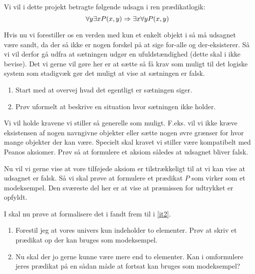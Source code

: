 \ifx\preampleIncluded\undefined
\def\startProjektTwo{}

\usepackage{enumitem}

\solutiontrue
\fi

Vi vil i dette projekt betragte følgende udsagn i ren prædikatlogik:
\[
	\forall y \exists x P(x,y) \Rightarrow \exists x \forall y P(x,y)
\]

Hvis nu vi forestiller os en verden med kun et enkelt objekt i så må udsagnet være sandt, da
der så ikke er nogen forskel på at sige for-alle og der-eksisterer. Så vi vil derfor gå udfra
at sætningen udgør en ufuldstændighed (dette skal i ikke bevise).
Det vi gerne vil gøre her er at sætte så få krav som muligt til det logiske system som stadigvæk
gør det muligt at vise at sætningen er falsk.

\begin{enumerate}
	\item Start med at overvej hvad det egentligt er sætningen siger.
	\item \label{it2} Prøv uformelt at beskrive en situation hvor sætningen ikke holder.
\end{enumerate}
	Vi vil holde kravene vi stiller så generelle som muligt. F.eks. vil vi ikke kræve eksistensen af nogen navngivne objekter eller sætte nogen øvre grænser
	for hvor mange objekter der kan være. Specielt skal kravet vi stiller være kompatibelt med Peanos aksiomer. Prøv så at formulere et aksiom således at udsagnet bliver falsk.

	Nu vil vi gerne vise at vore tilføjede aksiom er tilstrækkeligt til at vi kan vise at udsagnet er falsk. Så vi skal prøve at formulere et prædikat $P$
	som virker som et modeksempel. Den sværeste del her er at vise at præmissen for udtrykket er opfyldt.

	I skal nu prøve at formalisere det i fandt frem til i \ref{it2}. 
\begin{enumerate}[resume]
	\item Forestil jeg at vores univers kun indeholder to elementer. Prøv at skriv et prædikat op der kan bruges som modeksempel.

	\item Nu skal der jo gerne kunne være mere end to elementer. Kan i omformulere jeres prædikat på en sådan måde at fortsat kan bruges som modeksempel?	
\end{enumerate}

